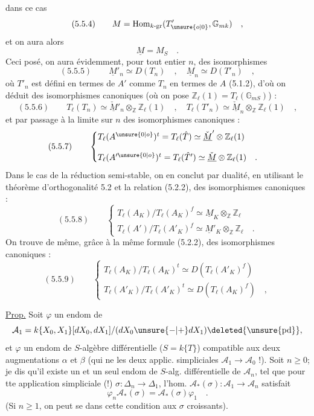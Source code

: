 dans ce cas
\[
(5.5.4)\qquad M=\operatorname{Hom}_{k\text{-gr}}(T'_{\unsure{o|0}},\mathbb G_{mk})\quad,
\]
et on aura alors
\[
\underline M=M_S\quad.
\]
Ceci posé, on aura évidemment, pour tout entier $n$, des isomorphismes
\[
(5.5.5)\qquad\underline M'_n\simeq D(T_n)\quad,\quad\underline M_n\simeq D(T'_n)\quad,
\]
où $T'_n$ est défini en termes de $A'$ comme $T_n$ en termes de $A$ (5.1.2), d'où on déduit des isomorphismes canoniques (où on pose $\mathbb Z_\ell(1)=T_\ell(\mathbb G_{mS})$) :
\[
(5.5.6)\qquad T_\ell(T_n)\simeq\check{\underline M}'_n\otimes_{\mathbb Z}\mathbb Z_\ell(1)\quad,\quad T_\ell(T'_n)\simeq\check{\underline M}_n\otimes_{\mathbb Z}\mathbb Z_\ell(1)\quad,
\]
et par passage à la limite sur $n$ des isomorphismes canoniques :
\[
(5.5.7)\qquad\begin{cases}
T_\ell(A^{\unsure{0|o}})^t=T_\ell(\hat T)\simeq\check{\underline M}'\otimes\mathbb Z_\ell(1)\\[1em]
T_\ell(A'^{\unsure{0|o}})^t=T_\ell(\hat T')\simeq\check{\underline M}\otimes\mathbb Z_\ell(1)\quad.
\end{cases}
\]
Dans le cas de la réduction semi-stable, on en conclut par dualité, en utilisant le théorème d'orthogonalité 5.2 et la relation (5.2.2), des isomorphismes canoniques :
\[
(5.5.8)\qquad\begin{cases}
T_\ell(A_K)/T_\ell(A_K)^f\simeq\underline M_K\otimes_{\mathbb Z}\mathbb Z_\ell\\[1em]
T_\ell(A')/T_\ell(A'_K)^f\simeq\underline M'_K\otimes_{\mathbb Z}\mathbb Z_\ell\quad.
\end{cases}
\]
On trouve de même, grâce à la même formule (5.2.2), des isomorphismes canoniques :
\[
(5.5.9)\qquad\begin{cases}
T_\ell(A_K)/T_\ell(A_K)^t\simeq D(T_\ell(A'_K)^f)\\[1em]
T_\ell(A'_K)/T_\ell(A'_K)^t\simeq D(T_\ell(A_K)^f)\quad,
\end{cases}
\]

\uline{Prop.} Soit $\varphi$ un endom de
\[
\mathcal A_1=k\{X_0,X_1\}[dX_0,dX_1]/(dX_0\unsure{-|+}dX_1)\deleted{\unsure{\mathrm{pd}}},
\]
et $\varphi$ \deleted{\unsure{\varphi}} un endom de $S$-algèbre différentielle ($S=k\{T\}$) compatible aux deux augmentations $\alpha$ et $\beta$ (qui ne  les deux applic. simpliciales $\mathcal A_1\longrightarrow\mathcal A_0$ !). Soit $n\ge0$; je dis qu'il existe un et un seul endom de $S$-alg. différentielle de $\mathcal A_n$,  tel que pour tte application simpliciale (!) $\sigma:\Delta_n\longrightarrow\Delta_1$, l'hom. $\mathcal A_*(\sigma):\mathcal A_1\to\mathcal A_n$ satisfait
\[
\varphi_n\mathcal A_*(\sigma)=\mathcal A_*(\sigma)\varphi_1\quad.
\]
 (Si $n\ge1$, on peut se   dans cette condition aux $\sigma$ croissants).

